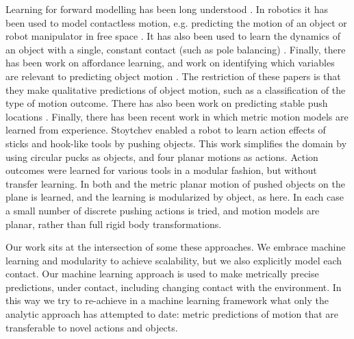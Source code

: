 Learning for forward modelling has been long understood \citep{JordanJacobs90, JordanRumelhart92}. In robotics it has been used to model contactless motion, e.g. predicting the motion of an object or robot manipulator in free space \citep{Ting06,Boots14,dearden2005learning}. It has also been used to learn the dynamics of an object with a single, constant contact (such as pole balancing) \citep{Schaal97,SchaalAtkeson97}. Finally, there has been work on affordance learning, and work on identifying which variables are relevant to predicting object motion \citep{montesano08,moldovan12,hermans11,fitzpatrick_learning_2003,ridge2010self,kroemer2014}. The restriction of these papers is that they make qualitative predictions of object motion, such as a classification of the type of motion outcome. There has also been work on predicting stable push locations \citep{hermans13}. Finally, there has been recent work in which metric motion models are learned from experience. Stoytchev \citep{Stoytchev_affordances_2008} enabled a robot to learn action effects of sticks and hook-like tools by pushing objects. This work simplifies the domain by using circular pucks as objects, and four planar motions as actions. Action outcomes were learned for various tools in a modular fashion, but without transfer learning.  In both \citep{mericli2014} and \cite{scholz2010combining} the metric planar motion of pushed objects on the plane is learned, and the learning is modularized by object, as here. In each case a small number of discrete pushing actions is tried, and motion models are planar, rather than full rigid body transformations.

Our work sits at the intersection of some these approaches. We embrace machine learning and modularity to achieve scalability, but we also explicitly model each contact. Our machine learning approach is used to make metrically precise predictions, under contact, including changing contact with the environment. In this way we try to re-achieve in a machine learning framework what only the analytic approach has attempted to date: metric predictions of motion that are transferable to novel actions and objects. 